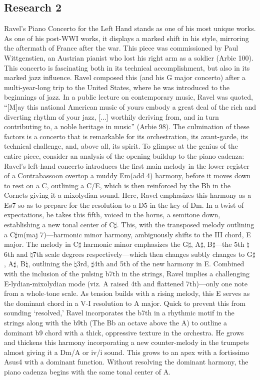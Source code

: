 \documentclass[11pt,a4paper]{article}
\begin{document}
\subsection{Research 2}

Ravel’s Piano Concerto for the Left Hand stands as one of his most unique works. As one of his post-WWI works, it displays a marked shift in his style, mirroring the aftermath of France after the war. This piece was commissioned by Paul Wittgenstien, an Austrian pianist who lost his right arm as a soldier (Arbie 100). This concerto is fascinating both in its technical accomplishment, but also in its marked jazz influence. Ravel composed this (and his G major concerto) after a multi-year-long trip to the United States, where he was introduced to the beginnings of jazz. In a public lecture on contemporary music, Ravel was quoted, “[M]ay this national American music of yours embody a great deal of the rich and diverting rhythm of your jazz, [...] worthily deriving from, and in turn contributing to, a noble heritage in music” (Arbie 98). The culmination of these factors is a concerto that is remarkable for its orchestration, its avant-garde, its technical challenge, and, above all, its spirit.
 To glimpse at the genius of the entire piece, consider an analysis of the opening buildup to the piano cadenza: Ravel’s left-hand concerto introduces the first main melody in the lower register of a Contrabassoon overtop a muddy Em(add 4) harmony, before it moves down to rest on a C, outlining a C/E, which is then reinforced by the Bb in the Cornets giving it a mixolydian sound. Here, Ravel emphasizes this harmony as a Eø7 so as to prepare for the resolution to a D5 in the key of Dm. In a twist of expectations, he takes this fifth, voiced in the horns, a semitone down, establishing a new tonal center of C$\sharp$. This, with the transposed melody outlining a C$\sharp$m(maj 7)—harmonic minor harmony, ambiguously shifts to the III chord, E major. The melody in C$\sharp$ harmonic minor emphasizes the G$\sharp$, A$\sharp$, B$\sharp$—the 5th $\natural$6th and $\natural$7th scale degrees respectively—which then changes subtly changes to G$\sharp$, A$\sharp$, B$\natural$, outlining the $\natural$3rd, $\sharp$4th and 5th of the new harmony in E. Combined with the inclusion of the pulsing b7th in the strings, Ravel implies a challenging E-lydian-mixolydian mode (viz. A raised 4th and flattened 7th)—only one note from a whole-tone scale. As tension builds with a rising melody, this E serves as the dominant chord in a V-I resolution to A major. Quick to prevent this from sounding ‘resolved,’ Ravel incorporates the b7th in a rhythmic motif in the strings along with the b9th (The Bb an octave above the A) to outline a dominant b9 chord with a thick, oppressive texture in the orchestra. He grows and thickens this harmony incorporating a new counter-melody in the trumpets almost giving it a Dm/A or iv/i sound. This grows to an apex with a fortissimo Asus4 with a dominant function. Without resolving the dominant harmony, the piano cadenza begins with the same tonal center of A.\autocite{ravel}
\end{document}
